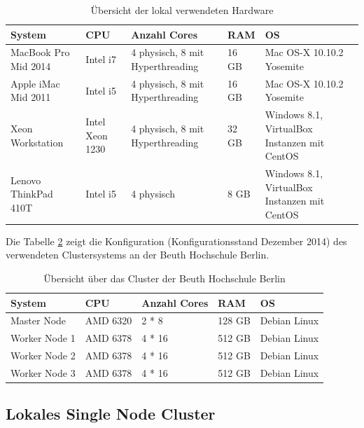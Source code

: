 \begin{table}[!ht]
\centering
\begin{tabular}{| p{3cm} | p{2.2cm} |  p{3cm} |  p{1.2cm} | p{3cm} | }
\hline
System & CPU & Anzahl Cores & RAM & OS\\ \hline \hline
MacBook Pro Mid 2014 & Intel i7 & 4 physisch, 8 mit Hyperthreading & 16 GB & Mac OS-X 10.10.2 Yosemite \\ \hline
Apple iMac Mid 2011 & Intel i5 & 4 physisch, 8 mit Hyperthreading & 16 GB & Mac OS-X 10.10.2 Yosemite \\ \hline
Xeon Workstation & Intel Xeon 1230 & 4 physisch, 8 mit Hyperthreading & 32 GB & Windows 8.1,  VirtualBox Instanzen mit CentOS  \\ \hline 
Lenovo ThinkPad 410T & Intel i5 & 4 physisch & 8 GB & Windows 8.1, VirtualBox Instanzen mit CentOS  \\ \hline 

\end{tabular}
\caption{Übersicht der lokal verwendeten Hardware}
	\label{tab:lokale hardware}
\end{table}  

Die Tabelle \ref{tab:cluster} zeigt die Konfiguration (Konfigurationsstand Dezember 2014) des verwendeten Clustersystems an der Beuth Hochschule Berlin. 

\begin{table}[!ht]
\centering
\begin{tabular}{| p{3cm} | p{2.2cm} |  p{3cm} |  p{1.2cm} | p{3cm} | }
\hline
System & CPU & Anzahl Cores & RAM & OS\\ \hline \hline
Master Node & AMD 6320 & 2 * 8  & 128 GB & Debian Linux \\ \hline
Worker Node 1 & AMD 6378 & 4 * 16 & 512 GB &  Debian Linux\\ \hline
Worker Node 2 & AMD 6378 & 4 * 16 & 512 GB &  Debian Linux\\ \hline
Worker Node 3 & AMD 6378 & 4 * 16 & 512 GB &  Debian Linux\\ \hline

\end{tabular}
\caption{Übersicht über das Cluster der Beuth Hochschule Berlin}
	\label{tab:cluster}
\end{table}  

\subsection{Lokales Single Node Cluster  }
\label{section:lokales single node}

